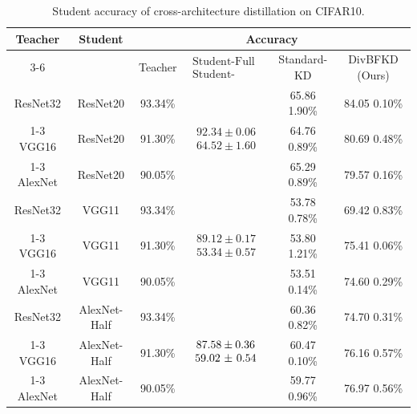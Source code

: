 \begin{table}[H]
    \caption{Student accuracy of cross-architecture distillation on CIFAR10.}
    \label{ch3:tab:Cross-architecture}
    \centering
    \begin{tabular}{c|c|c|c|c|c}
        \hline
        \multirow{2}{*}{\textbf{Teacher}} & \multirow{2}{*}{\textbf{Student}} & \multicolumn{4}{c|}{\textbf{Accuracy}}\tabularnewline \cline{3-6} \cline{4-6} \cline{5-6} \cline{6-6} &  & Teacher & $\begin{array}{c}\text{Student-Full}\\\text{Student-Alone}\end{array}$ & Standard-KD & DivBFKD (Ours)\\

        ResNet32 & ResNet20 & 93.34\% & \multirow{3}{*}{$\begin{array}{c}92.34\pm0.06\\64.52\pm1.60\end{array}$} & 65.86 1.90\% & 84.05 0.10\%\tabularnewline \cline{1-3} \cline{2-3} \cline{3-3} \cline{5-6} \cline{6-6}
        VGG16 & ResNet20 & 91.30\% &  & 64.76 0.89\% & 80.69 0.48\%\tabularnewline \cline{1-3} \cline{2-3} \cline{3-3} \cline{5-6} \cline{6-6}
        AlexNet & ResNet20 & 90.05\% &  & 65.29 0.89\% & 79.57 0.16\%\\

        ResNet32 & VGG11 & 93.34\% & \multirow{3}{*}{$\begin{array}{c}89.12\pm0.17\\53.34\pm0.57\end{array}$} & 53.78 0.78\% & 69.42 0.83\%\tabularnewline \cline{1-3} \cline{2-3} \cline{3-3} \cline{5-6} \cline{6-6}
        VGG16 & VGG11 & 91.30\% &  & 53.80 1.21\% & 75.41 0.06\%\tabularnewline \cline{1-3} \cline{2-3} \cline{3-3} \cline{5-6} \cline{6-6}
        AlexNet & VGG11 & 90.05\% &  & 53.51 0.14\% & 74.60 0.29\%\\

        ResNet32 & AlexNet-Half & 93.34\% & \multirow{3}{*}{$\begin{array}{c}87.58\pm0.36\\\text{59.02 \textpm\ 0.54}\end{array}$} & 60.36 0.82\% & 74.70 0.31\%\tabularnewline \cline{1-3} \cline{2-3} \cline{3-3} \cline{5-6} \cline{6-6}
        VGG16 & AlexNet-Half & 91.30\% &  & 60.47 0.10\% & 76.16 0.57\%\tabularnewline \cline{1-3} \cline{2-3} \cline{3-3} \cline{5-6} \cline{6-6}
        AlexNet & AlexNet-Half & 90.05\% &  & 59.77 0.96\% & 76.97 0.56\%\\
    \end{tabular}
\end{table}

